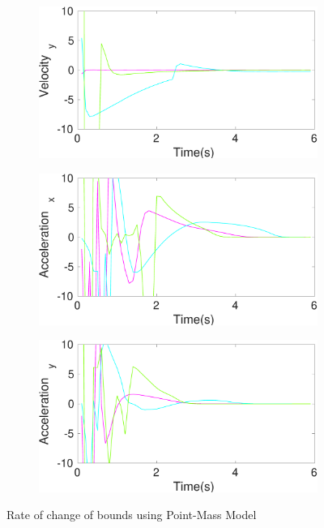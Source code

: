 \begin{figure}[!h]
\begin{subfigure}{.5\linewidth}
\end{subfigure}
\begin{subfigure}{.5\linewidth}
\centering
\includegraphics[width=\linewidth]{figures/BoundChange/PM/pm_bound_changeVelocity_y}
\end{subfigure}
\begin{subfigure}{.5\linewidth}
\centering
\includegraphics[width=\linewidth]{figures/BoundChange/PM/pm_bound_changeAcceleration_x}
\end{subfigure}
\begin{subfigure}{.5\linewidth}
\centering
\includegraphics[width=\linewidth]{figures/BoundChange/PM/pm_bound_changeAcceleration_y}
\end{subfigure}
\caption{Rate of change of bounds using Point-Mass Model}
\end{figure}
\clearpage
